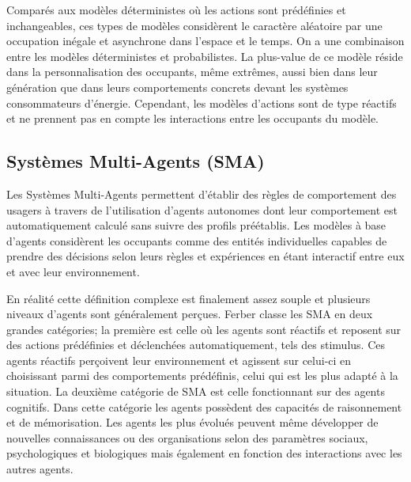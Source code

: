 Comparés aux modèles déterministes où les actions sont prédéfinies et inchangeables, ces types de modèles considèrent le caractère aléatoire par une occupation inégale et asynchrone dans l'espace et le temps. On a une combinaison entre les modèles déterministes et probabilistes. La plus-value de ce modèle réside dans la personnalisation des occupants, même extrêmes, aussi bien dans leur génération que dans leurs comportements concrets devant les systèmes consommateurs d'énergie. Cependant, les modèles d'actions sont de type réactifs et ne prennent pas en compte les interactions entre les occupants du modèle.

\subsection{Systèmes Multi-Agents (SMA)}
\label{Systèmes Multi-Agents}

Les Systèmes Multi-Agents permettent d'établir des règles de comportement des usagers à travers de l'utilisation d'agents autonomes dont leur comportement est automatiquement calculé sans suivre des profils préétablis. Les modèles à base d'agents considèrent les occupants comme des entités individuelles capables de prendre des décisions selon leurs règles et expériences en étant interactif entre eux et avec leur environnement.

En réalité cette définition complexe est finalement assez souple et plusieurs niveaux d'agents sont généralement perçues. Ferber \cite{Ferber-95} classe les SMA en deux grandes catégories; la première est celle où les agents sont réactifs et reposent sur des actions prédéfinies et déclenchées automatiquement, tels des stimulus. Ces agents réactifs perçoivent leur environnement et agissent sur celui-ci en choisissant parmi des comportements prédéfinis, celui qui est les plus adapté à la situation. La deuxième catégorie de SMA est celle fonctionnant sur des agents cognitifs. Dans cette catégorie les agents possèdent des capacités de raisonnement et de mémorisation. Les agents les plus évolués peuvent même développer de nouvelles connaissances ou des organisations selon des paramètres sociaux, psychologiques et biologiques mais également en fonction des interactions avec les autres agents.

